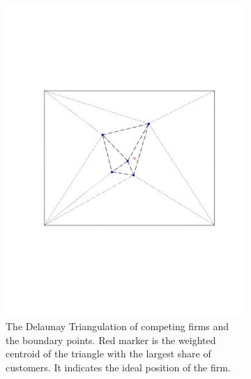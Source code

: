 \documentclass[preprint, 12pt]{elsarticle}
\begin{document}
\begin{figure}
\begin{subfigure}[t]{0.31\textwidth}
		\includegraphics[width=\textwidth, trim={34mm 76mm 28mm 76mm}]{Graphics/maxcov_b_delaunay.pdf}
		\caption{The Delaunay Triangulation of competing firms and the boundary points. Red marker is the weighted centroid of the triangle with the largest share of customers. It indicates the ideal position of the firm.}
		\label{fig:maxcov_delaunay}
	\end{subfigure}
	~
	\begin{subfigure}[t]{0.31\textwidth}

\end{subfigure}
\end{figure}
\end{document}
